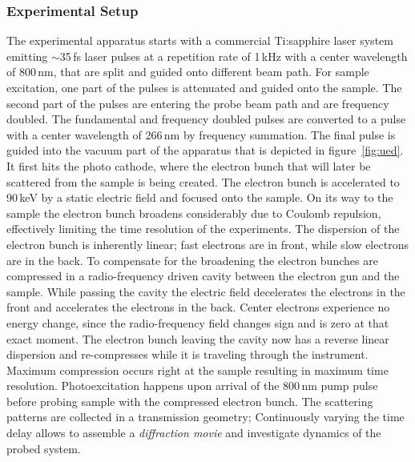 \subsubsection*{Experimental Setup}
The experimental apparatus starts with a commercial Ti:sapphire laser system emitting $\sim$35\,fs laser pulses at a repetition rate of 1\,kHz with a center wavelength of 800\,nm, that are split and guided onto different beam path\cite{chatelain2012}.
For sample excitation, one part of the pulses is attenuated and guided onto the sample.
The second part of the pulses are entering the probe beam path and are frequency doubled. The fundamental and frequency doubled pulses are converted to a pulse with a center wavelength of 266\,nm by frequency summation.
The final pulse is guided into the vacuum part of the apparatus that is depicted in figure~\ref{fig:ued}.
It first hits the photo cathode, where the electron bunch that will later be scattered from the sample is being created.
The electron bunch is accelerated to 90\,keV by a static electric field and focused onto the sample.
On its way to the sample the electron bunch broadens considerably due to Coulomb repulsion, effectively limiting the time resolution of the experiments.
The dispersion of the electron bunch is inherently linear; fast electrons are in front, while slow electrons are in the back.
To compensate for the broadening the electron bunches are compressed in a radio-frequency driven cavity between the electron gun and the sample\cite{otto2017}.
While passing the cavity the electric field decelerates the electrons in the front and accelerates the electrons in the back.
Center electrons experience no energy change, since the radio-frequency field changes sign and is zero at that exact moment.
The electron bunch leaving the cavity now has a reverse linear dispersion and re-compresses while it is traveling through the instrument.
Maximum compression occurs right at the sample resulting in maximum time resolution.
Photoexcitation happens upon arrival of the 800\,nm pump pulse before probing sample with the compressed electron bunch.
The scattering patterns are collected in a transmission geometry; Continuously varying the time delay allows to assemble a \emph{diffraction movie} and investigate dynamics of the probed system.

